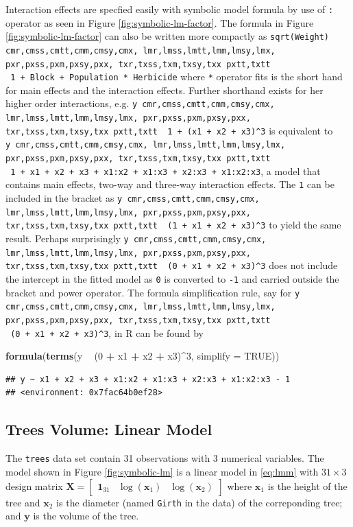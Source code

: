 \documentclass[runningheads]{llncs}
\makeatletter
\newcommand\midtilde@raisedtilde[1][.5]{\raisebox{#1ex}{\texttildelow}}
\def\midtilde@normaltilde{\texttildelow}
\newcommand\midtilde%
{%
  \expandafter\in@\expandafter{\f@family}%
    {cmr,cmss,cmtt,cmm,cmsy,cmx,%
    lmr,lmss,lmtt,lmm,lmsy,lmx,%
    pxr,pxss,pxm,pxsy,pxx,%
    txr,txss,txm,txsy,txx}%
  \ifin@%
    \midtilde@raisedtilde%
  \else%
    \expandafter\in@\expandafter{\f@family}%
    {pxtt,txtt}%
    \ifin@%
      \midtilde@raisedtilde[.35]%
    \else%
      \midtilde@normaltilde%
    \fi%
  \fi%
}
\newenvironment{Shaded}{\begin{snugshade}}{\end{snugshade}}
\newcommand{\DataTypeTok}[1]{\textcolor[rgb]{0.13,0.29,0.53}{#1}}
\newcommand{\DecValTok}[1]{\textcolor[rgb]{0.00,0.00,0.81}{#1}}
\newcommand{\KeywordTok}[1]{\textcolor[rgb]{0.13,0.29,0.53}{\textbf{#1}}}
\newcommand{\NormalTok}[1]{#1}
\newcommand{\OperatorTok}[1]{\textcolor[rgb]{0.81,0.36,0.00}{\textbf{#1}}}
\newcommand{\OtherTok}[1]{\textcolor[rgb]{0.56,0.35,0.01}{#1}}
\newcommand{\StringTok}[1]{\textcolor[rgb]{0.31,0.60,0.02}{#1}}
\makeatother
\begin{document}
Interaction effects are specfied easily with symbolic model formula by use of \texttt{:} operator as seen in Figure \ref{fig:symbolic-lm-factor}. The formula in Figure \ref{fig:symbolic-lm-factor} can also be written more compactly as \texttt{sqrt(Weight)} \texttt{\midtilde\ }\texttt{1\ +\ Block\ +\ Population\ *\ Herbicide} where \texttt{*} operator fits is the short hand for main effects and the interaction effects. Further shorthand exists for her higher order interactions, e.g. \texttt{y \midtilde\ }\texttt{1\ +\ (x1\ +\ x2\ +\ x3)\^{}3} is equivalent to\\
\texttt{y \midtilde\ }\texttt{1\ +\ x1\ +\ x2\ +\ x3\ +\ x1:x2\ +\ x1:x3\ +\ x2:x3\ +\ x1:x2:x3}, a model that contains main effects, two-way and three-way interaction effects. The \texttt{1} can be included in the bracket as \texttt{y \midtilde\ }\texttt{(1\ +\ x1\ +\ x2\ +\ x3)\^{}3} to yield the same result. Perhaps surprisingly \texttt{y \midtilde\ }\texttt{(0\ +\ x1\ +\ x2\ +\ x3)\^{}3} does not include the intercept in the fitted model as \texttt{0} is converted to \texttt{-1} and carried outside the bracket and power operator. The formula simplification rule, say for \texttt{y \midtilde\ }\texttt{(0\ +\ x1\ +\ x2\ +\ x3)\^{}3}, in R can be found by

\begin{Shaded}
\begin{Highlighting}[]
\KeywordTok{formula}\NormalTok{(}\KeywordTok{terms}\NormalTok{(y }\OperatorTok{~}\StringTok{ }\NormalTok{(}\DecValTok{0} \OperatorTok{+}\StringTok{ }\NormalTok{x1 }\OperatorTok{+}\StringTok{ }\NormalTok{x2 }\OperatorTok{+}\StringTok{ }\NormalTok{x3)}\OperatorTok{^}\DecValTok{3}\NormalTok{, }\DataTypeTok{simplify =} \OtherTok{TRUE}\NormalTok{))}
\end{Highlighting}
\end{Shaded}

\begin{verbatim}
## y ~ x1 + x2 + x3 + x1:x2 + x1:x3 + x2:x3 + x1:x2:x3 - 1
## <environment: 0x7fac64b0ef28>
\end{verbatim}

\hypertarget{trees}{%
\subsection{Trees Volume: Linear Model}\label{trees}}

The \texttt{trees} data set \autocite[original data source from][built-in data in R]{minitab} contain 31 observations with 3 numerical variables. The model shown in Figure \ref{fig:symbolic-lm} is a linear model in \eqref{eq:lmm} with \(31\times 3\) design matrix \(\mathbf{X} = \begin{bmatrix}\boldsymbol{1}_{31} & \log(\boldsymbol{x}_1) & \log(\boldsymbol{x}_2)\end{bmatrix}\) where \(\boldsymbol{x}_1\) is the height of the tree and \(\boldsymbol{x}_2\) is the diameter (named \texttt{Girth} in the data) of the correponding tree; and \(\boldsymbol{y}\) is the volume of the tree.
\end{document}
